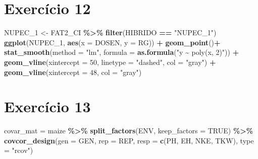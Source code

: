 \documentclass[
]{book}
\newenvironment{Shaded}{\begin{snugshade}}{\end{snugshade}}
\newcommand{\DataTypeTok}[1]{\textcolor[rgb]{0.13,0.29,0.53}{#1}}
\newcommand{\DecValTok}[1]{\textcolor[rgb]{0.00,0.00,0.81}{#1}}
\newcommand{\KeywordTok}[1]{\textcolor[rgb]{0.13,0.29,0.53}{\textbf{#1}}}
\newcommand{\NormalTok}[1]{#1}
\newcommand{\OperatorTok}[1]{\textcolor[rgb]{0.81,0.36,0.00}{\textbf{#1}}}
\newcommand{\OtherTok}[1]{\textcolor[rgb]{0.56,0.35,0.01}{#1}}
\newcommand{\StringTok}[1]{\textcolor[rgb]{0.31,0.60,0.02}{#1}}
\numberwithin{equation}{section}
\begin{document}
\hypertarget{exerc12}{%
\section{Exercício 12}\label{exerc12}}

\begin{Shaded}
\begin{Highlighting}[]
\NormalTok{NUPEC\_}\DecValTok{1}\NormalTok{ \textless{}{-}}\StringTok{ }
\StringTok{  }\NormalTok{FAT2\_CI }\OperatorTok{\%\textgreater{}\%}
\StringTok{  }\KeywordTok{filter}\NormalTok{(HIBRIDO }\OperatorTok{==}\StringTok{ "NUPEC\_1"}\NormalTok{)}
\KeywordTok{ggplot}\NormalTok{(NUPEC\_}\DecValTok{1}\NormalTok{, }\KeywordTok{aes}\NormalTok{(}\DataTypeTok{x =}\NormalTok{ DOSEN, }\DataTypeTok{y =}\NormalTok{ RG)) }\OperatorTok{+}
\KeywordTok{geom\_point}\NormalTok{()}\OperatorTok{+}
\KeywordTok{stat\_smooth}\NormalTok{(}\DataTypeTok{method =} \StringTok{"lm"}\NormalTok{, }\DataTypeTok{formula =} \KeywordTok{as.formula}\NormalTok{(}\StringTok{"y \textasciitilde{} poly(x, 2)"}\NormalTok{)) }\OperatorTok{+}
\KeywordTok{geom\_vline}\NormalTok{(}\DataTypeTok{xintercept =} \DecValTok{50}\NormalTok{, }\DataTypeTok{linetype =} \StringTok{"dashed"}\NormalTok{, }\DataTypeTok{col =} \StringTok{"gray"}\NormalTok{) }\OperatorTok{+}
\KeywordTok{geom\_vline}\NormalTok{(}\DataTypeTok{xintercept =} \DecValTok{48}\NormalTok{, }\DataTypeTok{col =} \StringTok{"gray"}\NormalTok{)}
\end{Highlighting}
\end{Shaded}

\hypertarget{exerc13}{%
\section{Exercício 13}\label{exerc13}}

\begin{Shaded}
\begin{Highlighting}[]
\NormalTok{covar\_mat =}\StringTok{ }\NormalTok{maize }\OperatorTok{\%\textgreater{}\%}
\StringTok{  }\KeywordTok{split\_factors}\NormalTok{(ENV, }\DataTypeTok{keep\_factors =} \OtherTok{TRUE}\NormalTok{) }\OperatorTok{\%\textgreater{}\%}
\StringTok{  }\KeywordTok{covcor\_design}\NormalTok{(}\DataTypeTok{gen =}\NormalTok{ GEN,}
                \DataTypeTok{rep =}\NormalTok{ REP,}
                \DataTypeTok{resp =} \KeywordTok{c}\NormalTok{(PH, EH, NKE, TKW),}
                \DataTypeTok{type =} \StringTok{"rcov"}\NormalTok{)}
\end{Highlighting}
\end{Shaded}
\end{document}
